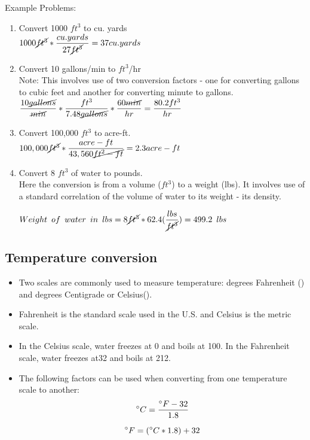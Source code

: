 Example Problems:\\
\begin{enumerate}[1.]
\item Convert 1000 $ft^3$ to cu. yards\\

$1000 \cancel{ft^3}*\dfrac{cu.yards}{27\cancel{ft^3}} = 37 cu.yards$

\item Convert 10 gallons/min to $ft^3$/hr\\
Note:  This involves use of two conversion factors - one for converting gallons to cubic feet and another for converting minute to gallons.\\ 
$\dfrac{10 \cancel{gallons}}{\cancel{min}}*  \dfrac{ft^3}{7.48 \cancel{gallons}}  * \dfrac{60 \cancel{min}}{hr}   = \dfrac{80.2ft^3}{hr}$


\item Convert 100,000 $ft^3$ to acre-ft.\\
$100,000 \cancel{ft^3} * \dfrac{acre-ft}{43,560 \cancel{ft^2-ft}} =  2.3 acre-ft$\\

\item Convert 8 $ft^3$ of water to pounds.\\
Here the conversion is from a volume ($ft^3$) to a weight (lbs).  It involves use of a standard correlation of the volume of water to its weight - its density. 

$Weight \enspace of \enspace water \enspace in \enspace lbs=8 \cancel{ft^3} *   62.4  (\dfrac{lbs}{\cancel{ft^3}}) = 499.2 \enspace lbs $\\

\end{enumerate}

\subsection{Temperature conversion}
\begin{itemize}
\item Two scales are commonly used to measure temperature: degrees Fahrenheit () and degrees Centigrade or Celsius(). 
\item Fahrenheit is the standard scale used in the U.S. and Celsius is the metric scale. 
\item In the Celsius scale, water freezes at 0 and boils at 100. In the Fahrenheit scale, water freezes at32 and boils at 212. 
\item The following factors can be used when converting from one temperature scale to another:
$$\degree{C} = \dfrac{\degree{F}-32}{1.8}$$

$$\degree{F}=(\degree{C} * 1.8)+32$$
\end{itemize}

